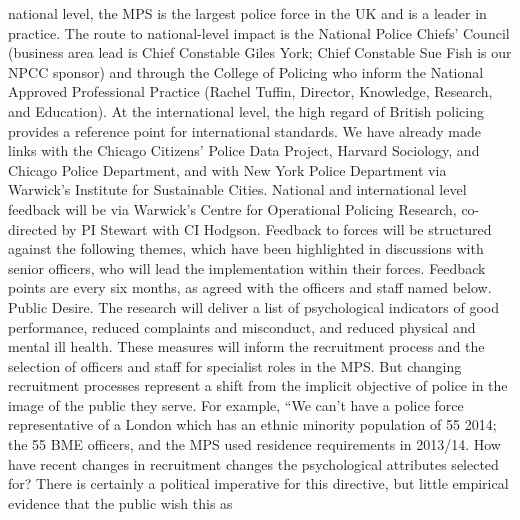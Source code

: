 \documentclass[11pt, a4paper]{article}
\begin{document}
national level, the MPS is the largest police force in the UK and is a leader in practice. The
route to national-level impact is the National Police Chiefs’ Council (business area lead is
Chief Constable Giles York; Chief Constable Sue Fish is our NPCC sponsor) and through
the College of Policing who inform the National Approved Professional Practice (Rachel
Tuffin, Director, Knowledge, Research, and Education). At the international level, the high
regard of British policing provides a reference point for international standards. We have
already made links with the Chicago Citizens’ Police Data Project, Harvard Sociology, and
Chicago Police Department, and with New York Police Department via Warwick’s Institute for
Sustainable Cities. National and international level feedback will be via Warwick’s Centre for
Operational Policing Research, co-directed by PI Stewart with CI Hodgson.
Feedback to forces will be structured against the following themes, which have been
highlighted in discussions with senior officers, who will lead the implementation within their
forces. Feedback points are every six months, as agreed with the officers and staff named
below.
Public Desire. The research will deliver a list of psychological indicators of good
performance, reduced complaints and misconduct, and reduced physical and mental ill
health. These measures will inform the recruitment process and the selection of officers and
staff for specialist roles in the MPS. But changing recruitment processes represent a shift
from the implicit objective of police in the image of the public they serve. For example, “We
can’t have a police force representative of a London which has an ethnic minority population
of 55%
2014; the 55%
BME officers, and the MPS used residence requirements in 2013/14. How have recent
changes in recruitment changes the psychological attributes selected for? There is certainly
a political imperative for this directive, but little empirical evidence that the public wish this as
\end{document}

